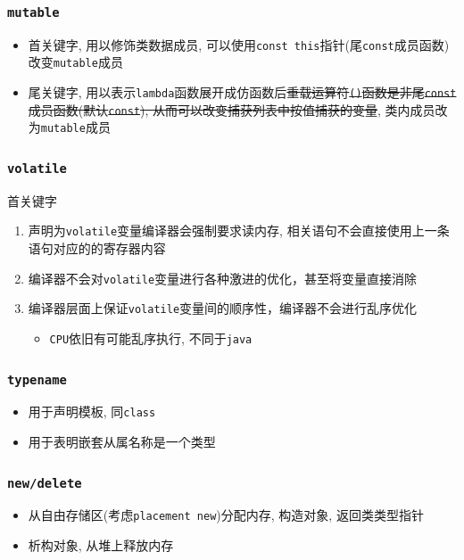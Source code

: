 \subsubsection{\tt mutable}
\begin{itemize}
	\item 首关键字, 用以修饰类数据成员, 可以使用{\tt const this}指针(尾{\tt const}成员函数)改变{\tt mutable}成员
	\item 尾关键字, 用以表示{\tt lambda}函数展开成仿函数后\sout{重载运算符{\tt ()}函数是非尾{\tt const}成员函数(默认{\tt const}), 
			从而可以改变捕获列表中按值捕获的变量}, 类内成员改为{\tt mutable}成员
\end{itemize}

\subsubsection{\tt volatile}
首关键字
\begin{enumerate}
	\item 声明为{\tt volatile}变量编译器会强制要求读内存, 相关语句不会直接使用上一条语句对应的的寄存器内容
	\item 编译器不会对{\tt volatile}变量进行各种激进的优化，甚至将变量直接消除
	\item 编译器层面上保证{\tt volatile}变量间的顺序性，编译器不会进行乱序优化
	\begin{itemize}
		\item {\tt CPU}依旧有可能乱序执行, 不同于{\tt java}
	\end{itemize}
\end{enumerate}

\subsubsection{\tt typename}
\begin{itemize}
	\item 用于声明模板, 同{\tt class}
	\item 用于表明嵌套从属名称是一个类型
\end{itemize}
\subsubsection{\tt new/delete}

\begin{itemize}
	\item 从自由存储区(考虑{\tt placement new})分配内存, 构造对象, 返回类类型指针
	\item 析构对象, 从堆上释放内存
\end{itemize}

